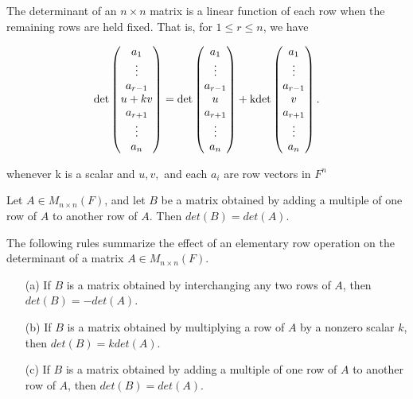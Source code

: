 		\begin{example}
		\end{example}
		
		
		\begin{thm*}
		$ $\\The determinant of an $n \times n$ matrix is a linear function of each row when the remaining rows are held fixed. That is, for $1 \leq r \leq n$, we have
		
		\[\rm	 
		det\left( \begin{matrix} a_1 \\ \vdots \\ a_{r-1} \\ u + kv \\ a_{r+1} \\ \vdots \\ a_n \end{matrix}\right) = 
		det\left( \begin{matrix} a_1 \\ \vdots \\ a_{r-1} \\ u \\ a_{r+1} \\ \vdots \\ a_n \end{matrix}\right) + 
		kdet\left( \begin{matrix} a_1 \\ \vdots \\ a_{r-1} \\ v \\ a_{r+1} \\ \vdots \\ a_n \end{matrix}\right)   .\]
		
		whenever k is a scalar and $u, v,$ and each $a_i$ are row vectors in $F^n$
		
		\end{thm*}
		
		\begin{thm*}
		$ $\\Let $A \in M_{n \times n}(F)$, and let $B$ be a matrix obtained by adding a multiple of one row of $A$ to another row of $A$. Then $det(B) = det(A)$.
		\end{thm*}
		
		The following rules summarize the effect of an elementary row operation on the determinant of a matrix $A \in M_{n \times n}(F)$.
		
		\begin{enumerate} 
			\item[(a)] If $B$ is a matrix obtained by interchanging any two rows of $A$, then $det(B) = − det(A)$.
			\item[(b)] If $B$ is a matrix obtained by multiplying a row of $A$ by a nonzero scalar $k$, then $det(B) = k det(A)$.
			\item[(c)] If $B$ is a matrix obtained by adding a multiple of one row of $A$ to another row of $A$, then $det(B) = det(A)$.
		\end{enumerate}
		
